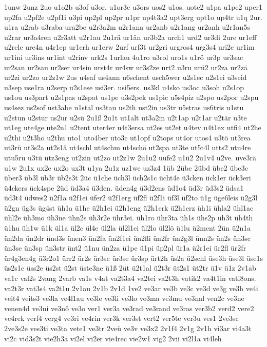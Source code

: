 {1unw
2unz
2uo
u1o2b
u3of
u3or.
u1or3c
u3ors
uos2
u1os.
uote2
u1pa
u1pe2
uper1
up2fa
u2pf2e
u2pf1i
u3pi
up2pl
up2pr
u1pr
up4t3a2
upt3erg
upt1o
up4tr
u1q
2ur.
u1ra
u2rab
u3raba
ura2be
u2r3a2m
u2r1ana
ur2anb
u2r1ang
ur2anh
u2r1an5s
u2rar
ur3a4ren
u2r3att
u2r1au
2u1rä
ur1än
ur3b2a
urch1
urd2
ur3di
2ure
ur1eff
u2rele
ure4n
u4r1ep
ur1erh
ur1erw
2urf
urf3t
ur2gri
urgros4
urg3s4
uri2c
ur1im
ur1ini
ur3ins
ur1int
u2rinv
urk2s
1urlau
4u1ro
u3rol
uro1s
u1rö
ur3p
ur3sac
ur2san
ur2sau
ur2ser
ur4sin
urst4r
ur4sw
ur3s2ze
urt2
u3ru
urü2
ur2za
ur2zä
ur2zi
ur2zo
ur2z1w
2us
u4saf
us4ann
u6schent
usch5wer
u2s1ec
u2s1ei
u3seid
u3sep
use1ra
u2serp
u2s1ese
usi3er.
usi5ers.
us3kl
u4sko
us3oc
u3soh
u2s1op
us1ou
us3part
u2s1pas
u2spat
us1pe
u3s2pek
us1pic
u5s4piz
u2spo
us2por
u2spu
us4sez
us2sof
ust3abe
u1stal
us3tau
us2th
ust2in
us3tr
u5stras
us6tris
u1stu
u2stun
u2stur
us2ur
u2sü
2u1ß
2u1t
ut1alt
ut3a2m
u2t1ap
u2t1ar
u2tär
u3te
ut1eg
ute4ge
ute2n1
u2tent
uter4er
u4t3ersa
ut2es
ut2et
u4tev
u4t1ex
utfi4
ut2he
u2thi
u2t3ho
u2thu
uto1
uto4ber
uto3c
ut1opf
u2tops
ut4or
utos4
u3tö
ut3rea
ut3rü
ut3s2a
ut2s1ä
ut4schl
ut4schm
ut4schö
ut2spa
ut3te
ut5t4l
utts2
utu4re
utu5ru
u3tü
utz3eng
ut2zin
ut2zo
ut2z1w
2u1u2
uufe2
u1ü2
2u1v4
u2ve.
uve3rä
u1w
2u1x
ux2e
ux2o
ux3t
u1ya
2u1z
uz1we
uz3z4
1üb
2übc
2übd
übe2
übe3c
über3
üb3l
üb3r
üb2s3t
2üc
ü1che
üch3l
üch2s1c
ücht4e
ü3cken
ück1er
ück3eri
ü4ckers
ück4spe
2üd
üd3a4
ü3den.
üden4g
ü3d2ens
üd1o4
üd3r
üd3s2
üdsa1
üd3t4
üdwes2
ü2f1a
ü2f1ei
üfer2
ü2f1erg
üf2fl
ü2f1i
üf3l
üf2to
ü1g
üge6leis
ü2g3l
ü2gn
üg3s
üg4st
üh1a
ü1he
ü2h1ei
ü2h1eng
ü2h1erk
ü2h1erz
üh1i
ühla2
ühl1ac
ühl2e
üh3mo
üh3ne
ühn2s
üh3r2e
ühr3ei.
üh1ro
ühr3ta
üh1s
ühs2p
üh3t
üh4th
ü1hu
üh1w
ü1k
ül1a
ül2c
ül4e
ül2la
ül2l1ei
ül2lo
ül2lö
ü1lu
ü2ment
2ün
ü2n1a
ün2da
ün2dr
ünd3s
ünen3
ün2fa
ün2f1ei
ün2fli
ün2fr
ün2g3l
ünn2s
ün2s
ün3sc
ün3se
ün3sp
ün3str
ünt2
ü1nu
ün2za
ü1pe
ü1pi
üp2pl
ür1a
ü2r1ei
ür2fl
ür2fr
ür4g3en4g
ü3r2o1
ürr2
ür2s
ür3sc
ür3se
ür3sp
ürt2h
üs2a
ü2schl
üse3h
üse3l
üse1s
üs2s1c
üss2e
üs2st
ü2st
üste3ne
ü1ß
2üt
ü2t1al
ü2t3r
üt2s1
üt2tr
ü1v
ü1z
2v1ab
va1c
val2s
2vang
2varb
va1s
v4at
va2t3a4
va2tei
va2t3h
vatik2
va4t1in
vati8ons.
va2t3r
vat3s4
va2t1u
2v1au
2v1b
2v1d
1ve2
ve3ar
ve3b
ve3c
ve3d
ve3g
ve3h
ve4i
veit4
veits3
ve3la
ve4l1au
ve3le
ve3li
ve3lo
ve3ma
ve3mu
ve3nal
ven2c
ve3ne
venen4d
ve3ni
ve3nö
ve3o
ver1
ver3a
ve3rad
ve3rand
ve3ras
ver3b2
verd2
vere2
ve4rek
verf4
verg4
ve3ri
ve4rin
ver3k
ver3st
vert2
ver5te
ver3u
ves1
2ve3sc
2ve3s2e
ves3ti
ve3ta
vete1
ve3tr
2veü
ve3v
ve3x2
2v1f4
2v1g
2v1h
vi3ar
vi4a3t
vi2c
vid3s2t
vie2h3a
vi2el
vi2er
vie4rec
vie2w1
vig2
2vii
vi2l1a
vi4leh
}
